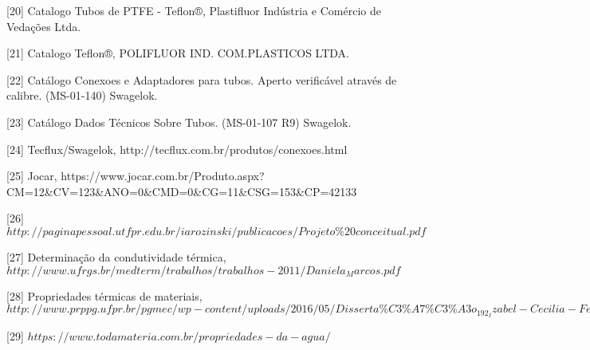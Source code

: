 [20] Catalogo Tubos de PTFE - Teflon®, Plastifluor Indústria e Comércio de Vedações Ltda.

[21] Catalogo Teflon®, POLIFLUOR IND. COM.PLASTICOS LTDA. 

[22] Catálogo Conexoes e Adaptadores para tubos. Aperto verificável através de calibre. (MS-01-140) Swagelok.

[23] Catálogo Dados Técnicos Sobre Tubos. (MS-01-107 R9) Swagelok.

[24] Tecflux/Swagelok, http://tecflux.com.br/produtos/conexoes.html

[25] Jocar, https://www.jocar.com.br/Produto.aspx?CM=12\&CV=123\&ANO=0\&CMD=0\&CG=11\&CSG=153\&CP=42133

[26] $http://paginapessoal.utfpr.edu.br/iarozinski/publicacoes/Projeto\%20conceitual.pdf$

[27] Determinação da condutividade térmica, $http://www.ufrgs.br/medterm/trabalhos/trabalhos-2011/Daniela_Marcos.pdf$

[28] Propriedades térmicas de materiais, $http://www.prppg.ufpr.br/pgmec/wp-content/uploads/2016/05/Disserta\%C3\%A7\%C3\%A3o_192_Izabel-Cecilia-Ferreira-de-Souza-Vicentin.pdf$

[29] $https://www.todamateria.com.br/propriedades-da-agua/$
